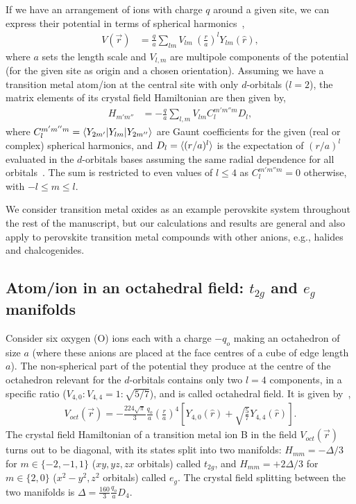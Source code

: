 \documentclass[a4paper,prb,twocolumn]{revtex4-1}  %
\newcommand{\ylm}[1]{Y_{#1}(\hat r)}
\begin{document}
If we have an arrangement of ions with charge $q$ around a given site,
we can express their %
potential in terms of spherical harmonics~\cite{PavariniChap}, 
\begin{align}
V(\vec r) &= \frac{q}{a}\sum_{lm}V_{lm}~\left(\frac{r}{a}\right)^l \ylm{lm},
\end{align}
where $a$ sets the length scale
and $V_{l,m}$ are multipole components of the potential
 (for the given site as origin and a chosen orientation).
Assuming we have a transition metal atom/ion
at the central site
with
only $d$-orbitals ($l=2$),
the matrix elements of its crystal field Hamiltonian
are then given by,
\begin{align}
H_{m' m''} &= -\frac{q}{a}\sum_{l,m} V_{lm} C_{l}^{m'm''m} D_{l} ,
\end{align}
where 
$C_{l}^{m'm''m}=\braket{Y_{2m'}| Y_{lm}| Y_{2m''}}$ are Gaunt coefficients for the given (real or complex) spherical harmonics,
and $D_{l}=\braket{(r/a)^l}$
is the expectation of $(r/a)^l$ evaluated in the $d$-orbitals bases
assuming the same radial dependence for all orbitals~\cite{PaxtonNotes}.
The sum is restricted to even values of $l\leq 4$ as 
$C_{l}^{m'm''m}=0$ otherwise,
with $-l \leq m \leq l$.


We consider transition metal oxides as an example perovskite system throughout the rest of the manuscript,
but our calculations and results are general and also apply to perovskite transition metal compounds with other anions, e.g., halides and chalcogenides.

 
\subsection{Atom/ion in an octahedral field: $t_{2g}$  and $e_g$ manifolds}
\label{sec:egt2g}
Consider six oxygen (O) ions each with a charge $-q_o$ making an octahedron of size $a$ (where these anions are placed at the face centres of a cube of edge length $a$).
The non-spherical part of the potential they
 produce at the centre of the octahedron
 relevant for the $d$-orbitals contains 
 only two $l=4$ components, 
  in a specific ratio (${V_{4,0}:V_{4,4}=1:\sqrt{5/7}}$),
 and is called octahedral field. 
It is given by~\cite{PavariniChap},
\begin{align}
\label{eq:voct}
V_{oct}(\vec r) = -\frac{224\sqrt{\pi}}{3}\frac{q_o}{a} \left(\frac{r}{a}\right)^4\left[\ylm{4,0}+\sqrt{\frac{5}{7}}\ylm{4,4} \right].
\end{align}
The crystal field Hamiltonian of a transition metal ion B 
in the field $V_{oct}(\vec r)$
turns out to be diagonal,
with its states split into two manifolds: 
$H_{mm} = -\Delta/3$ for $m\in\{-2,-1,1\}$ ($xy,yz,zx$ orbitals)
called $t_{2g}$,
and 
$H_{mm} = +2\Delta/3$ for $m\in\{2,0\}$ ($x^2-y^2,z^2$ orbitals)
called $e_g$.
The crystal field splitting between the two manifolds is
${\Delta=\frac{160}{3}\frac{q_o}{a} D_{4}}$.
\end{document}
